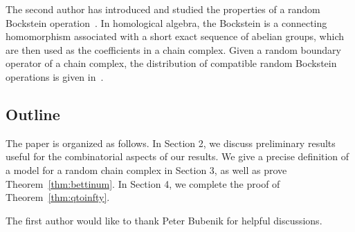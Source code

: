 
The second author has introduced and studied the
properties of a random Bockstein operation~\cite{zabka2018random}. 
In homological algebra,
the Bockstein is a connecting homomorphism associated with a short exact
sequence of abelian groups, which are then used as the coefficients in a chain
complex. Given a random boundary operator of a chain complex, the distribution of compatible
random Bockstein operations is given in~\cite[Thm 5.2]{zabka2018random}.

\subsection*{Outline}
  The paper is organized as follows. In Section 2, we discuss preliminary results useful for 
  the combinatorial aspects of our results. We give a precise definition of a model for a 
  random chain complex in Section 3, as well as prove
  Theorem~\ref{thm:bettinum}. In Section 4, we complete the proof of Theorem~\ref{thm:qtoinfty}.



  \begin{acknowledgements}
 The first author would like to thank Peter Bubenik for helpful discussions.
 \end{acknowledgements}
